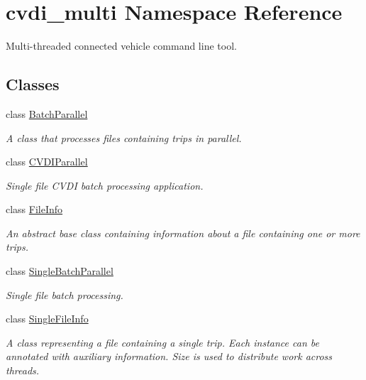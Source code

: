 \hypertarget{namespacecvdi__multi}{}\section{cvdi\+\_\+multi Namespace Reference}
\label{namespacecvdi__multi}


Multi-\/threaded connected vehicle command line tool.  


\subsection*{Classes}
\begin{DoxyCompactItemize}
\item 
class \hyperlink{classcvdi__multi_1_1BatchParallel}{Batch\+Parallel}
\begin{DoxyCompactList}\small\item\em A class that processes files containing trips in parallel. \end{DoxyCompactList}\item 
class \hyperlink{classcvdi__multi_1_1CVDIParallel}{C\+V\+D\+I\+Parallel}
\begin{DoxyCompactList}\small\item\em Single file C\+V\+DI batch processing application. \end{DoxyCompactList}\item 
class \hyperlink{classcvdi__multi_1_1FileInfo}{File\+Info}
\begin{DoxyCompactList}\small\item\em An abstract base class containing information about a file containing one or more trips. \end{DoxyCompactList}\item 
class \hyperlink{classcvdi__multi_1_1SingleBatchParallel}{Single\+Batch\+Parallel}
\begin{DoxyCompactList}\small\item\em Single file batch processing. \end{DoxyCompactList}\item 
class \hyperlink{classcvdi__multi_1_1SingleFileInfo}{Single\+File\+Info}
\begin{DoxyCompactList}\small\item\em A class representing a file containing a single trip. Each instance can be annotated with auxiliary information. Size is used to distribute work across threads. \end{DoxyCompactList}\end{DoxyCompactItemize}
